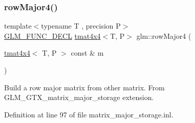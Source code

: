 \subsubsection{\texorpdfstring{rowMajor4()}{rowMajor4()}\hspace{0.1cm}{\footnotesize\ttfamily [2/2]}}
{\footnotesize\ttfamily template$<$typename T , precision P$>$ \\
\mbox{\hyperlink{setup_8hpp_ab2d052de21a70539923e9bcbf6e83a51}{G\+L\+M\+\_\+\+F\+U\+N\+C\+\_\+\+D\+E\+CL}} \mbox{\hyperlink{structglm_1_1tmat4x4}{tmat4x4}}$<$T, P$>$ glm\+::row\+Major4 (\begin{DoxyParamCaption}\item[{\mbox{\hyperlink{structglm_1_1tmat4x4}{tmat4x4}}$<$ T, P $>$ const \&}]{m }\end{DoxyParamCaption})}

Build a row major matrix from other matrix. From G\+L\+M\+\_\+\+G\+T\+X\+\_\+matrix\+\_\+major\+\_\+storage extension. 

Definition at line 97 of file matrix\+\_\+major\+\_\+storage.\+inl.

